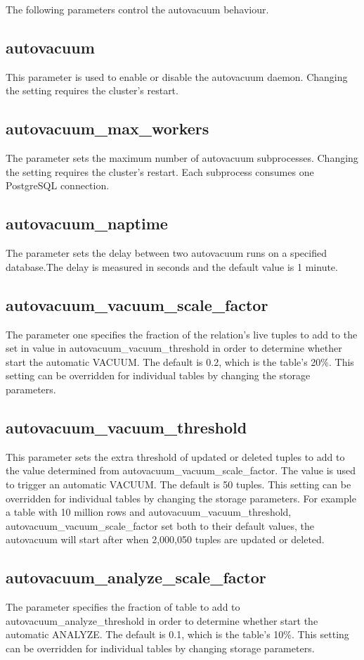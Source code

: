 The following parameters control the autovacuum behaviour.

\subsection{autovacuum}
This parameter is used to enable or disable the autovacuum daemon. Changing the setting requires
the cluster's restart.

\subsection{autovacuum\_max\_workers}
The parameter sets the maximum number of autovacuum subprocesses. Changing the setting requires the
cluster's restart. Each subprocess consumes one PostgreSQL connection.

\subsection{autovacuum\_naptime}
The parameter sets the delay between two autovacuum runs on a specified database.The delay is
measured in seconds and the default value is 1 minute.

\subsection{autovacuum\_vacuum\_scale\_factor}
The parameter one specifies the fraction of the relation's live tuples to add to the set in value in
autovacuum\_vacuum\_threshold in order to determine whether start the automatic VACUUM. The default is 0.2,
which is the table's 20\%. This setting can be overridden for individual tables by changing the storage
parameters.

\subsection{autovacuum\_vacuum\_threshold}
This parameter sets the extra threshold of updated or deleted tuples to add to the value determined
from autovacuum\_vacuum\_scale\_factor. The value is used to trigger an automatic VACUUM. The default is 50
tuples. This setting can be overridden for individual tables by changing the storage parameters. For
example a table with 10 million rows and autovacuum\_vacuum\_threshold, autovacuum\_vacuum\_scale\_factor
set both to their default values, the autovacuum will start after when 2,000,050 tuples are updated or
deleted.

\subsection{autovacuum\_analyze\_scale\_factor}
The parameter specifies the fraction of table to add to autovacuum\_analyze\_threshold in order to determine
whether start the automatic ANALYZE. The default is 0.1, which is the table's 10\%. This setting can be
overridden for individual tables by changing storage parameters.

